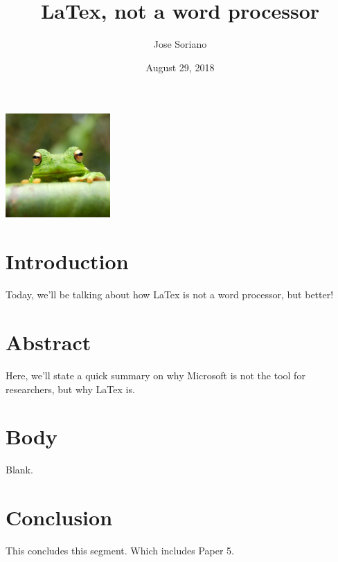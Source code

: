 \documentclass[10pt,sigconf]{acmart}
\title {LaTex, not a word processor}
\author{Jose Soriano}
\date{August 29, 2018}
\begin{document}
\maketitle

\includegraphics[width=4cm, height=4cm]{frog.jpg}

\section{Introduction}

Today, we'll be talking about how LaTex is not a word processor, but better!

\section{Abstract}

Here, we'll state a quick summary on why Microsoft is not the tool for researchers, but why LaTex is. 

\section{Body}

Blank. 

\section{Conclusion}
This concludes this segment. Which includes Paper 5. 
\end{document}
